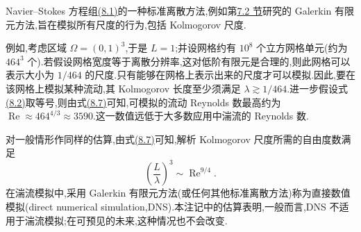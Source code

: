 \begin{note}
\label{note:kolmogorov-scales-numerical-impact}
Navier--Stokes 方程组\hyperref[eq:turbulent-navier-stokes]{(8.1)}的一种标准离散方法,例如第\hyperref[sec:time-dependent-fem-continuous]{7.2 节}研究的 Galerkin 有限元方法,旨在模拟所有尺度的行为,包括 Kolmogorov 尺度.

例如,考虑区域 $\Omega=(0,1)^3$,于是 $L=1$;并设网格约有 $10^8$ 个立方网格单元(约为 $464^3$ 个).若假设网格宽度等于离散分辨率,这对低阶有限元是合理的,则此网格可以表示大小为 $1/464$ 的尺度.只有能够在网格上表示出来的尺度才可以模拟.因此,要在该网格上模拟某种流动,其 Kolmogorov 长度至少须满足 $\lambda\gtrsim1/464$.进一步假设式\hyperref[eq:turbulent-energy-dissipation-scaling]{(8.2)}取等号,则由式\hyperref[eq:kolmogorov-length-reynolds-scaling]{(8.7)}可知,可模拟的流动 Reynolds 数最高约为 $\operatorname{Re}\approx464^{4/3}\approx3590$.这一数值远低于大多数应用中湍流的 Reynolds 数.

对一般情形作同样的估算,由式\hyperref[eq:kolmogorov-length-reynolds-scaling]{(8.7)}可知,解析 Kolmogorov 尺度所需的自由度数满足
\[
 \left(\frac{L}{\lambda}\right)^3\sim\operatorname{Re}^{9/4}.
\]
在湍流模拟中,采用 Galerkin 有限元方法(或任何其他标准离散方法)称为直接数值模拟(direct numerical simulation,DNS).本注记中的估算表明,一般而言,DNS 不适用于湍流模拟;在可预见的未来,这种情况也不会改变.
\end{note}

